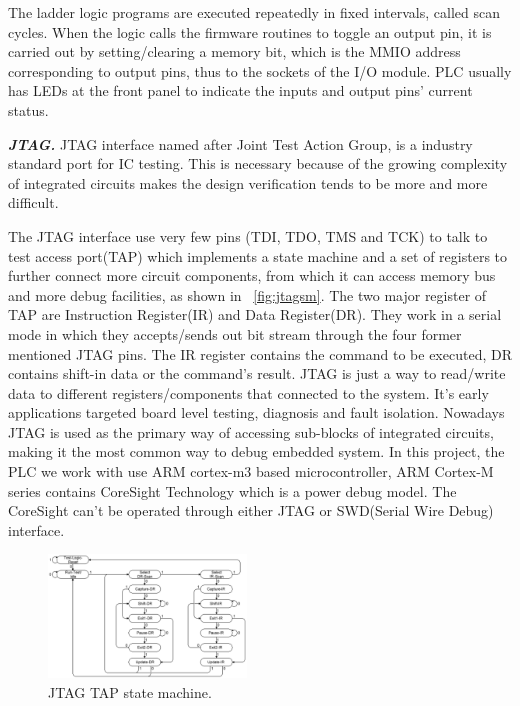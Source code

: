 The ladder logic programs are executed repeatedly in fixed intervals, called scan cycles. When the logic calls the firmware routines to toggle an output pin, it is carried out by setting/clearing a memory bit, which is the MMIO address corresponding to output pins, thus to the sockets of the I/O module. PLC usually has LEDs at the front panel to indicate the inputs and output pins' current status.


\textbf{\textit{JTAG.}} JTAG interface named after Joint Test Action Group, is a industry standard port for IC testing. This is necessary because of the growing complexity of integrated circuits makes the design verification tends to be more and more difficult.

The JTAG interface use very few pins (TDI, TDO, TMS and TCK) to talk to test access port(TAP) which implements a state machine and a set of registers to further connect more circuit components, from which it can access memory bus and more debug facilities, as shown in ~\autoref{fig:jtagsm}. The two major register of TAP are Instruction Register(IR) and Data Register(DR). They work in a serial mode in which they accepts/sends out bit stream through the four former mentioned JTAG pins. The IR register contains the command to be executed, DR contains shift-in data or the command's result. JTAG is just a way to read/write data to different registers/components that connected to the system. It's early applications targeted board level testing, diagnosis and fault isolation. Nowadays JTAG is used as the primary way of accessing sub-blocks of integrated circuits, making it the most common way to debug embedded system. In this project, the PLC we work with use ARM cortex-m3 based microcontroller, ARM Cortex-M series  contains CoreSight Technology which is a power debug model. The CoreSight can't be operated through either JTAG or SWD(Serial Wire Debug) interface.

\begin{figure}[th]
	\includegraphics[width=0.47\textwidth]{figures/jtagsm}
	\centering
	\caption{JTAG TAP state machine.}
	\label{fig:jtagsm}
\end{figure}


